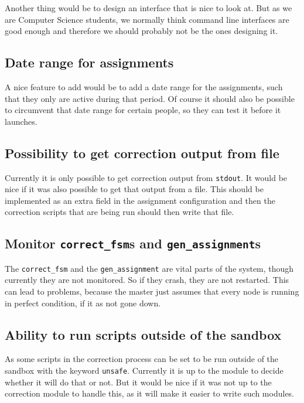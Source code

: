 Another thing would be to design an interface that is nice to look at. But as we
are Computer Science students, we normally think command line interfaces are
good enough and therefore we should probably not be the ones designing it.

\subsection{Date range for assignments}
A nice feature to add would be to add a date range for the assignments, such
that they only are active during that period. Of course it should also be
possible to circumvent that date range for certain people, so they can test it
before it launches.

\subsection{Possibility to get correction output from file}
Currently it is only possible to get correction output from \texttt{stdout}. It
would be nice if it was also possible to get that output from a file. This
should be implemented as an extra field in the assignment configuration and then
the correction scripts that are being run should then write that file.

\subsection{Monitor \texttt{correct\_fsm}s and \texttt{gen\_assignment}s}
The \texttt{correct\_fsm} and the \texttt{gen\_assignment} are vital parts of
the system, though currently they are not monitored. So if they crash, they are
not restarted. This can lead to problems, because the master just assumes that
every node is running in perfect condition, if it as not gone down.

\subsection{Ability to run scripts outside of the sandbox}
As some scripts in the correction process can be set to be run outside of the
sandbox with the keyword \texttt{unsafe}. Currently it is up to the module to
decide whether it will do that or not. But it would be nice if it was not up to
the correction module to handle this, as it will make it easier to write such
modules.
